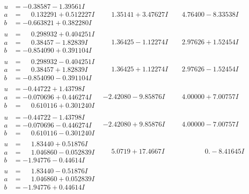 \documentclass[1p]{elsarticle_modified}
\theoremstyle{definition}
\begin{document}
$$\begin{array}{c|c|c}
\begin{aligned}
u &= -0.38587 - 1.39561 I \\
a &= \phantom{-}0.132291 + 0.512227 I \\
b &= -0.663821 + 0.382280 I\end{aligned}
 & \phantom{-}1.35141 + 3.47627 I & \phantom{-}4.76400 - 8.33538 I \\ \hline\begin{aligned}
u &= \phantom{-}0.298932 + 0.404251 I \\
a &= \phantom{-}0.38457 - 1.82839 I \\
b &= -0.854090 + 0.391104 I\end{aligned}
 & \phantom{-}1.36425 - 1.12274 I & \phantom{-}2.97626 + 1.52454 I \\ \hline\begin{aligned}
u &= \phantom{-}0.298932 - 0.404251 I \\
a &= \phantom{-}0.38457 + 1.82839 I \\
b &= -0.854090 - 0.391104 I\end{aligned}
 & \phantom{-}1.36425 + 1.12274 I & \phantom{-}2.97626 - 1.52454 I \\ \hline\begin{aligned}
u &= -0.44722 + 1.43798 I \\
a &= -0.070696 + 0.446274 I \\
b &= \phantom{-}0.610116 + 0.301240 I\end{aligned}
 & -2.42080 - 9.85876 I & \phantom{-}4.00000 + 7.00757 I \\ \hline\begin{aligned}
u &= -0.44722 - 1.43798 I \\
a &= -0.070696 - 0.446274 I \\
b &= \phantom{-}0.610116 - 0.301240 I\end{aligned}
 & -2.42080 + 9.85876 I & \phantom{-}4.00000 - 7.00757 I \\ \hline\begin{aligned}
u &= \phantom{-}1.83440 + 0.51876 I \\
a &= \phantom{-}1.046860 - 0.052839 I \\
b &= -1.94776 - 0.44614 I\end{aligned}
 & \phantom{-}5.0719 + 17.4667 I & \phantom{-0.000000 } 0. - 8.41645 I \\ \hline\begin{aligned}
u &= \phantom{-}1.83440 - 0.51876 I \\
a &= \phantom{-}1.046860 + 0.052839 I \\
b &= -1.94776 + 0.44614 I\end{aligned}

\end{array}$$
\end{document}
